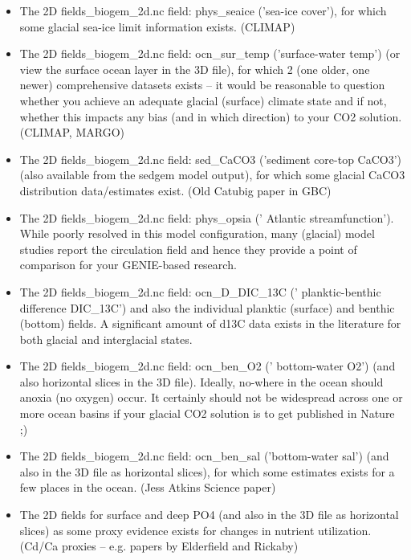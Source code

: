 \documentclass[11pt,fleqn]{book} %
\begin{document}
\begin{itemize}
        \item 
The 2D fields\_biogem\_2d.nc field: phys\_seaice ('sea-ice cover'), for which some glacial
sea-ice limit information exists. (CLIMAP)
        \item 
The 2D fields\_biogem\_2d.nc field: ocn\_sur\_temp ('surface-water temp') (or view the
surface ocean layer in the 3D file), for which 2 (one older, one newer) comprehensive
datasets exists -- it would be reasonable to question whether you achieve an adequate
glacial (surface) climate state and if not, whether this impacts any bias (and in which
direction) to your CO2 solution. (CLIMAP, MARGO)
        \item 
The 2D fields\_biogem\_2d.nc field: sed\_CaCO3 ('sediment core-top CaCO3') (also
available from the sedgem model output), for which some glacial CaCO3 distribution
data/estimates exist. (Old Catubig paper in GBC)
        \item 
The 2D fields\_biogem\_2d.nc field: phys\_opsia (' Atlantic streamfunction'). While poorly
resolved in this model configuration, many (glacial) model studies report the circulation field
and hence they provide a point of comparison for your GENIE-based research.
        \item 
The 2D fields\_biogem\_2d.nc field: ocn\_D\_DIC\_13C (' planktic-benthic difference
DIC\_13C') and also the individual planktic (surface) and benthic (bottom) fields. A
significant amount of d13C data exists in the literature for both glacial and interglacial states.
        \item 
The 2D fields\_biogem\_2d.nc field: ocn\_ben\_O2 (' bottom-water O2') (and also horizontal
slices in the 3D file). Ideally, no-where in the ocean should anoxia (no oxygen) occur. It
certainly should not be widespread across one or more ocean basins if your glacial CO2
solution is to get published in Nature ;)
        \item 
The 2D fields\_biogem\_2d.nc field: ocn\_ben\_sal ('bottom-water sal') (and also in the 3D
file as horizontal slices), for which some estimates exists for a few places in the ocean.
(Jess Atkins Science paper)
        \item 
The 2D fields for surface and deep PO4 (and also in the 3D file as horizontal slices) as
some proxy evidence exists for changes in nutrient utilization. (Cd/Ca proxies – e.g. papers
by Elderfield and Rickaby)

\end{itemize}
\end{document}
